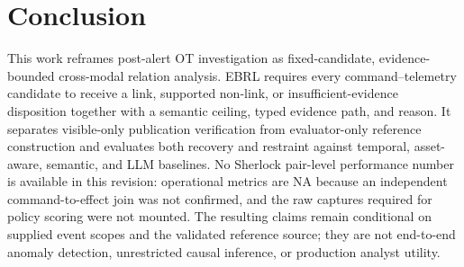 \documentclass[conference]{IEEEtran}
\newcommand{\NA}{\textsc{NA}}
\begin{document}
\section{Conclusion}

This work reframes post-alert OT investigation as fixed-candidate, evidence-bounded cross-modal relation analysis. EBRL requires every command--telemetry candidate to receive a link, supported non-link, or insufficient-evidence disposition together with a semantic ceiling, typed evidence path, and reason. It separates visible-only publication verification from evaluator-only reference construction and evaluates both recovery and restraint against temporal, asset-aware, semantic, and LLM baselines. No Sherlock pair-level performance number is available in this revision: operational metrics are \NA{} because an independent command-to-effect join was not confirmed, and the raw captures required for policy scoring were not mounted. The resulting claims remain conditional on supplied event scopes and the validated reference source; they are not end-to-end anomaly detection, unrestricted causal inference, or production analyst utility.


\end{document}
